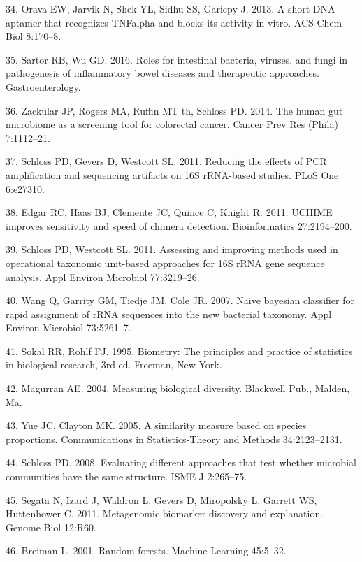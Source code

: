 \documentclass[11pt,]{article}
\begin{document}
\hypertarget{ref-orava_short_2013}{}
34. Orava EW, Jarvik N, Shek YL, Sidhu SS, Gariepy J. 2013. A short DNA
aptamer that recognizes TNFalpha and blocks its activity in vitro. ACS
Chem Biol 8:170--8.

\hypertarget{ref-sartor_microbesIBD_2016}{}
35. Sartor RB, Wu GD. 2016. Roles for intestinal bacteria, viruses, and
fungi in pathogenesis of inflammatory bowel diseases and therapeutic
approaches. Gastroenterology.

\hypertarget{ref-zackular_CRC_2014}{}
36. Zackular JP, Rogers MA, Ruffin MT th, Schloss PD. 2014. The human
gut microbiome as a screening tool for colorectal cancer. Cancer Prev
Res (Phila) 7:1112--21.

\hypertarget{ref-schloss_PCRartifacts_2011}{}
37. Schloss PD, Gevers D, Westcott SL. 2011. Reducing the effects of PCR
amplification and sequencing artifacts on 16S rRNA-based studies. PLoS
One 6:e27310.

\hypertarget{ref-edgar_uchime_2011}{}
38. Edgar RC, Haas BJ, Clemente JC, Quince C, Knight R. 2011. UCHIME
improves sensitivity and speed of chimera detection. Bioinformatics
27:2194--200.

\hypertarget{ref-schloss_OTUanalysis_2011}{}
39. Schloss PD, Westcott SL. 2011. Assessing and improving methods used
in operational taxonomic unit-based approaches for 16S rRNA gene
sequence analysis. Appl Environ Microbiol 77:3219--26.

\hypertarget{ref-wang_taxonomy_2007}{}
40. Wang Q, Garrity GM, Tiedje JM, Cole JR. 2007. Naive bayesian
classifier for rapid assignment of rRNA sequences into the new bacterial
taxonomy. Appl Environ Microbiol 73:5261--7.

\hypertarget{ref-sokal_biometrystats_1995}{}
41. Sokal RR, Rohlf FJ. 1995. Biometry: The principles and practice of
statistics in biological research, 3rd ed. Freeman, New York.

\hypertarget{ref-magurran_measuring_2004}{}
42. Magurran AE. 2004. Measuring biological diversity. Blackwell Pub.,
Malden, Ma.

\hypertarget{ref-yue_thetaYC_2005}{}
43. Yue JC, Clayton MK. 2005. A similarity measure based on species
proportions. Communications in Statistics-Theory and Methods
34:2123--2131.

\hypertarget{ref-schloss_commstruct_2008}{}
44. Schloss PD. 2008. Evaluating different approaches that test whether
microbial communities have the same structure. ISME J 2:265--75.

\hypertarget{ref-segata_biomarker_2011}{}
45. Segata N, Izard J, Waldron L, Gevers D, Miropolsky L, Garrett WS,
Huttenhower C. 2011. Metagenomic biomarker discovery and explanation.
Genome Biol 12:R60.

\hypertarget{ref-breiman_rf_2001}{}
46. Breiman L. 2001. Random forests. Machine Learning 45:5--32.
\end{document}
